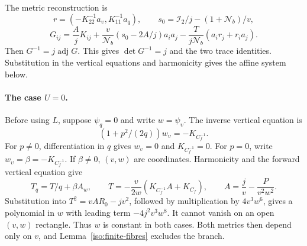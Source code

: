 \documentclass[11pt,a4paper]{article}
\numberwithin{equation}{section}
\theoremstyle{plain}
\theoremstyle{definition}
\theoremstyle{remark}
\begin{document}
The metric reconstruction is
\[
 r=(-K_{22}^{-1}a_\upsilon,K_{11}^{-1}a_q),\qquad
 s_0=\mathcal I_2/j-(1+\mathcal N_b)/v,
\]
\begin{equation}\label{appiso-G-reconstruct}
 G_{ij}=\frac AjK_{ij}+
       \frac v{\mathcal N_b}(s_0-2A/j)a_i a_j
       -\frac{T}{j\mathcal N_b}(a_i r_j+r_i a_j).
\end{equation}
Then $G^{-1}=j\operatorname{adj}G$.  This gives $\det G^{-1}=j$ and the two trace identities. Substitution in the vertical equations and harmonicity gives the affine system below.

\paragraph{The case $U=0$.}
Before using $L$, suppose $\psi_q=0$ and write $w=\psi_\upsilon$.
The inverse vertical equation is
\[
 (1+p^2/(2q))w_\upsilon=-K_{C_f^{-1}}.
\]
For $p\ne0$, differentiation in $q$ gives $w_\upsilon=0$ and $K_{C_f^{-1}}=0$.
For $p=0$, write $w_\upsilon=\beta=-K_{C_f^{-1}}$.  If $\beta\ne0$, $(v,w)$
are coordinates.  Harmonicity and the forward vertical equation give
\[
 T_q=T/q+\beta A_w,\qquad
 T=-\frac{v}{2w}(K_{C_f^{-1}}A+K_{C_f}),\qquad
 A=\frac jv-\frac{P}{v^2w^2}.
\]
Substitution into $T^2=vAR_0-jv^2$, followed by multiplication by
$4v^3w^6$, gives a polynomial in $w$ with leading term
$-4j^2v^3w^8$.  It cannot vanish on an open $(v,w)$ rectangle.
Thus $w$ is constant in both cases.  Both metrics then depend only on $v$,
and Lemma~\ref{iso:finite-fibres} excludes the branch.
\end{document}
